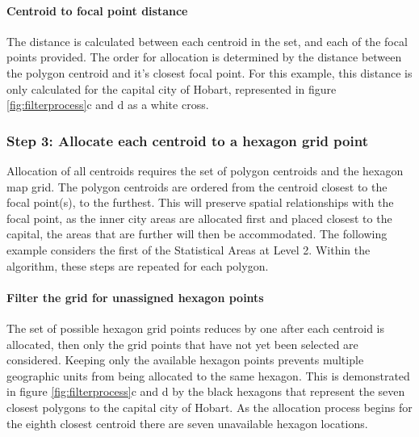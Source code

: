 \hypertarget{centroid-to-focal-point-distance}{%
\paragraph{Centroid to focal point
distance}\label{centroid-to-focal-point-distance}}

The distance is calculated between each centroid in the set, and each of
the focal points provided. The order for allocation is determined by the
distance between the polygon centroid and it's closest focal point. For
this example, this distance is only calculated for the capital city of
Hobart, represented in figure \ref{fig:filterprocess}c and d as a white
cross.

\hypertarget{step-3-allocate-each-centroid-to-a-hexagon-grid-point}{%
\subsubsection{Step 3: Allocate each centroid to a hexagon grid
point}\label{step-3-allocate-each-centroid-to-a-hexagon-grid-point}}

Allocation of all centroids requires the set of polygon centroids and
the hexagon map grid. The polygon centroids are ordered from the
centroid closest to the focal point(s), to the furthest. This will
preserve spatial relationships with the focal point, as the inner city
areas are allocated first and placed closest to the capital, the areas
that are further will then be accommodated. The following example
considers the first of the Statistical Areas at Level 2. Within the
algorithm, these steps are repeated for each polygon.

\hypertarget{filter-the-grid-for-unassigned-hexagon-points}{%
\paragraph{Filter the grid for unassigned hexagon
points}\label{filter-the-grid-for-unassigned-hexagon-points}}

The set of possible hexagon grid points reduces by one after each
centroid is allocated, then only the grid points that have not yet been
selected are considered. Keeping only the available hexagon points
prevents multiple geographic units from being allocated to the same
hexagon. This is demonstrated in figure \ref{fig:filterprocess}c and d
by the black hexagons that represent the seven closest polygons to the
capital city of Hobart. As the allocation process begins for the eighth
closest centroid there are seven unavailable hexagon locations.

